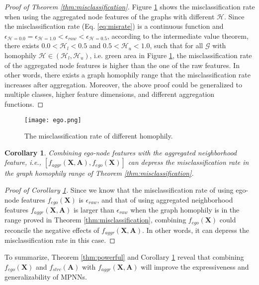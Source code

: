 \documentclass{article}
\theoremstyle{plain}
\newtheorem{corollary}{Corollary}[theorem]
\begin{document}
\begin{proof}[Proof of Theorem \ref{thm:misclassification}]
Figure \ref{fig:misrate} shows the misclassification rate when using the aggregated node features of the graphs with different $\mathcal{H}$. Since the misclassification rate (Eq. \ref{eq:misrate}) is a continuous function and $\epsilon_{\mathcal{H} = 0.0}=\epsilon_{\mathcal{H} = 1.0}<\epsilon_{raw}<\epsilon_{\mathcal{H} = 0.5}$, according to the intermediate value theorem, there exists $0.0<\mathcal{H}_l<0.5$ and $0.5<\mathcal{H}_u<1.0$, such that for all $\mathcal{G}$ with homophily $\mathcal{H} \in (\mathcal{H}_l,\mathcal{H}_u)$, i.e. green area in Figure \ref{fig:misrate}, the misclassification rate of the aggregated node features is higher than the one of the raw features. 
In other words, there exists a graph homophily range that the misclassification rate increases after aggregation. Moreover, the above proof could be generalized to multiple classes, higher feature dimensions, and different aggregation functions.
\end{proof}

\begin{figure}[t]
\centering
\texttt{[image: ego.png]}
\vspace{-10pt}
\caption{The misclassification rate of different homophily.}
\label{fig:misrate}
\end{figure}
\vspace{-8pt}

\begin{corollary} \label{cor:ego}
Combining ego-node features with the aggregated neighborhood feature, i.e., $[f_{aggr}(\mathbf{X},\mathbf{A}), f_{ego}(\mathbf{X})]$ can depress the misclassification rate in the graph homophily range of Theorem \ref{thm:misclassification}.
\end{corollary}
\vspace{-10pt}
\begin{proof}[Proof of Corollary \ref{cor:ego}] 
Since we know that the misclassification rate of using ego-node features $f_{ego}(\mathbf{X})$ is $\epsilon_{raw}$, and that of using aggregated neighborhood features $f_{aggr}(\mathbf{X},\mathbf{A})$ is larger than $\epsilon_{raw}$ when the graph homophily is in the range proved in Theorem \ref{thm:misclassification}, combining $f_{ego}(\mathbf{X})$ could reconcile the negative effects of $f_{aggr}(\mathbf{X},\mathbf{A})$. In other words, it can depress the misclassification rate in this case.
\end{proof}



To summarize, Theorem \ref{thm:powerful} and Corollary \ref{cor:ego} reveal that combining $f_{ego}(\mathbf{X})$ and $f_{strc}(\mathbf{A})$ with $f_{aggr}(\mathbf{X},\mathbf{A})$ will improve the expressiveness and generalizability of MPNNs.
\end{document}
